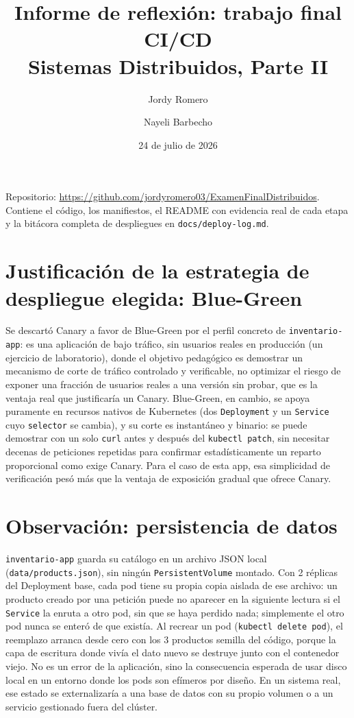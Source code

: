 \documentclass[11pt,a4paper]{article}
\title{\vspace{-1.5em}\color{brand}\textbf{Informe de reflexión: trabajo final CI/CD}\\[2pt]\large Sistemas Distribuidos, Parte II}
\author{Jordy Romero \and Nayeli Barbecho}
\date{24 de julio de 2026}
\begin{document}
\maketitle
\vspace{-1.2em}

Repositorio: \url{https://github.com/jordyromero03/ExamenFinalDistribuidos}. Contiene el
código, los manifiestos, el README con evidencia real de cada etapa y la bitácora completa de
despliegues en \texttt{docs/deploy-log.md}.

\section{Justificación de la estrategia de despliegue elegida: Blue-Green}

Se descartó Canary a favor de Blue-Green por el perfil concreto de \texttt{inventario-app}: es
una aplicación de bajo tráfico, sin usuarios reales en producción (un ejercicio de laboratorio),
donde el objetivo pedagógico es demostrar un mecanismo de corte de tráfico controlado y
verificable, no optimizar el riesgo de exponer una fracción de usuarios reales a una versión sin
probar, que es la ventaja real que justificaría un Canary. Blue-Green, en cambio, se apoya
puramente en recursos nativos de Kubernetes (dos \texttt{Deployment} y un \texttt{Service} cuyo
\texttt{selector} se cambia), y su corte es instantáneo y binario: se puede demostrar con un solo
\texttt{curl} antes y después del \texttt{kubectl patch}, sin necesitar decenas de peticiones
repetidas para confirmar estadísticamente un reparto proporcional como exige Canary. Para el
caso de esta app, esa simplicidad de verificación pesó más que la ventaja de exposición gradual
que ofrece Canary.

\section{Observación: persistencia de datos}

\texttt{inventario-app} guarda su catálogo en un archivo JSON local
(\texttt{data/products.json}), sin ningún \texttt{PersistentVolume} montado. Con 2 réplicas del
Deployment base, cada pod tiene su propia copia aislada de ese archivo: un producto creado por
una petición puede no aparecer en la siguiente lectura si el \texttt{Service} la enruta a otro
pod, sin que se haya perdido nada; simplemente el otro pod nunca se enteró de que existía. Al
recrear un pod (\texttt{kubectl delete pod}), el reemplazo arranca desde cero con los 3
productos semilla del código, porque la capa de escritura donde vivía el dato nuevo se destruye
junto con el contenedor viejo. No es un error de la aplicación, sino la consecuencia esperada de
usar disco local en un entorno donde los pods son efímeros por diseño. En un sistema real, ese
estado se externalizaría a una base de datos con su propio volumen o a un servicio gestionado
fuera del clúster.
\end{document}
